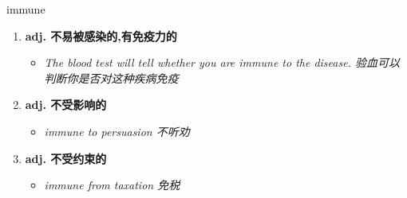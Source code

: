 
\begin{frame}
{\huge immune}
\begin{center}
\begin{enumerate}\Large
  \item \textbf{adj. 不易被感染的,有免疫力的}
  \begin{itemize}
    \item \em{\Large{The blood test will tell whether you are immune to the disease. 验血可以判断你是否对这种疾病免疫}}
  \end{itemize}
  \item \textbf{adj. 不受影响的}
  \begin{itemize}
    \item \em{\Large{immune to persuasion 不听劝}}
  \end{itemize}
  \item \textbf{adj. 不受约束的}
  \begin{itemize}
    \item \em{\Large{immune from taxation 免税}}
  \end{itemize}
\end{enumerate}
\end{center}
\end{frame}
